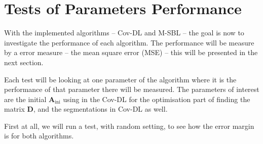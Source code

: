 \section{Tests of Parameters Performance}
With the implemented algorithms -- Cov-DL and M-SBL -- the goal is now to investigate the performance of each algorithm. The performance will be measure by a error measure -- the mean square error (MSE) -- this will be presented in the next section.

Each test will be looking at one parameter of the algorithm where it is the performance of that parameter there will be measured. The parameters of interest are the initial $\mathbf{A}_{\text{ini}}$ using in the Cov-DL for the optimisation part of finding the matrix $\mathbf{D}$, and the segmentations in Cov-DL as well.

First at all, we will run a test, with random setting, to see how the error margin is for both algorithms.

